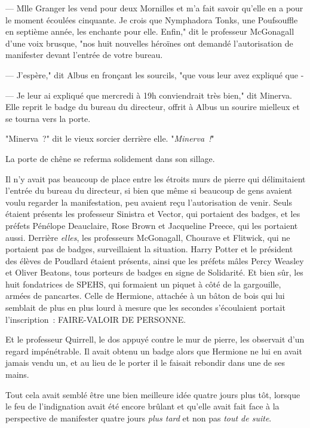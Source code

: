 --- Mlle Granger les vend pour deux Mornilles et m'a fait savoir qu'elle en a pour le moment écoulées cinquante. Je crois que Nymphadora Tonks, une Poufsouffle en septième année, les enchante pour elle. Enfin," dit le professeur McGonagall d'une voix brusque, "nos huit nouvelles héroïnes ont demandé l'autorisation de manifester devant l'entrée de votre bureau.

--- J'espère," dit Albus en fronçant les sourcils, "que vous leur avez expliqué que -

--- Je leur ai expliqué que mercredi à 19h conviendrait très bien," dit Minerva. Elle reprit le badge du bureau du directeur, offrit à Albus un sourire mielleux et se tourna vers la porte.

"Minerva~?" dit le vieux sorcier derrière elle. "\emph{Minerva~!}"

La porte de chêne se referma solidement dans son sillage.

\later

Il n'y avait pas beaucoup de place entre les étroits murs de pierre qui délimitaient l'entrée du bureau du directeur, si bien que même si beaucoup de gens avaient voulu regarder la manifestation, peu avaient reçu l'autorisation de venir. Seuls étaient présents les professeur Sinistra et Vector, qui portaient des badges, et les préfets Pénélope Deauclaire, Rose Brown et Jacqueline Preece, qui les portaient aussi. Derrière \emph{elles}, les professeurs McGonagall, Chourave et Flitwick, qui ne portaient pas de badges, surveillaient la situation. Harry Potter et le président des élèves de Poudlard étaient présents, ainsi que les préfets mâles Percy Weasley et Oliver Beatons, tous porteurs de badges en signe de Solidarité. Et bien sûr, les huit fondatrices de SPEHS, qui formaient un piquet à côté de la gargouille, armées de pancartes. Celle de Hermione, attachée à un bâton de bois qui lui semblait de plus en plus lourd à mesure que les secondes s'écoulaient portait l'inscription~: FAIRE-VALOIR DE PERSONNE.

Et le professeur Quirrell, le dos appuyé contre le mur de pierre, les observait d'un regard impénétrable. Il avait obtenu un badge alors que Hermione ne lui en avait jamais vendu un, et au lieu de le porter il le faisait rebondir dans une de ses mains.

Tout cela avait semblé être une bien meilleure idée quatre jours plus tôt, lorsque le feu de l'indignation avait été encore brûlant et qu'elle avait fait face à la perspective de manifester quatre jours \emph{plus tard} et non pas \emph{tout de suite}.

